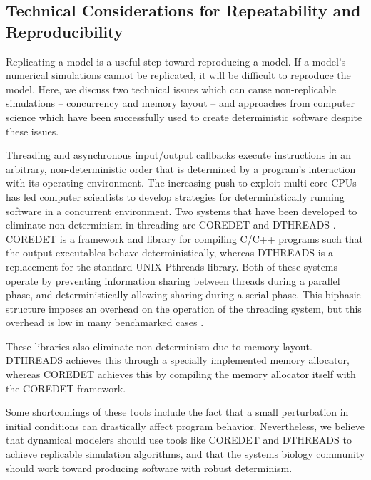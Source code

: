 \documentclass[journal,transmag,twoside]{IEEEtran}
\begin{document}
\subsection{Technical Considerations for Repeatability and Reproducibility}

Replicating a model is a useful step toward reproducing a model.
If a model's numerical simulations cannot be replicated, it will be
difficult to reproduce the model. Here, we discuss two technical issues which can 
cause non-replicable simulations -- concurrency and memory layout -- 
and approaches from computer science which have been successfully used to create 
deterministic software despite these issues.

Threading and asynchronous input/output callbacks execute instructions in an arbitrary,
non-deterministic order that is determined by a program's interaction with 
its operating environment. The increasing push to exploit multi-core CPUs has
led computer scientists to develop strategies for deterministically running software 
in a concurrent environment. Two systems that have been developed to eliminate non-determinism in threading
are C{\small ORE}D{\small ET} \cite{bergan2010coredet} and D{\small THREADS} \cite{liu2011dthreads}.
C{\small ORE}D{\small ET} is a framework and library for compiling C/C++ programs
such that the output executables behave deterministically, whereas
D{\small THREADS} is a replacement for the standard UNIX Pthreads library.
Both of these systems operate by preventing information sharing between
threads during a parallel phase, and deterministically allowing sharing
during a serial phase.
This biphasic structure imposes an overhead on the operation of the threading
system, but this overhead is low in many benchmarked cases \cite{liu2011dthreads}. 

These libraries also eliminate non-determinism
due to memory layout. D{\small THREADS} achieves this through a specially implemented memory allocator,
whereas C{\small ORE}D{\small ET} achieves this by compiling the
memory allocator itself with the C{\small ORE}D{\small ET} framework.

Some shortcomings of these tools include the fact that a small perturbation in initial
conditions can drastically affect program behavior.
Nevertheless, we believe that
dynamical modelers should use tools like C{\small ORE}D{\small ET} and D{\small THREADS}
to achieve replicable simulation algorithms, and that the systems biology community should
work toward producing software with robust determinism.
\end{document}
